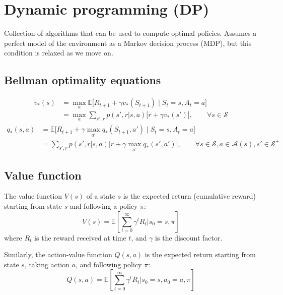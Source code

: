 \section{Dynamic programming (DP)}

Collection of algorithms that can be used to compute optimal policies.
Assumes a perfect model of the environment as a Markov decision process (MDP), but this condition is relaxed as we move on.

\subsection{Bellman optimality equations}

\begin{equation}
    \begin{aligned}
        v_*(s)
         & =
        \max_{a} \mathbb{E} \big[ R_{t+1} + \gamma v_*(S_{t+1}) \;\big|\; S_t = s, A_t = a \big]
        \\ & =
        \max_{a} \sum_{s', r} p(s', r | s, a) \Big[ r + \gamma v_*(s') \Big]
        , \qquad \forall s \in \mathcal{S}
    \end{aligned}
\end{equation}
\begin{equation}
    \begin{aligned}
        q_*(s, a)
         & =
        \mathbb{E} \big[ R_{t+1} + \gamma \max_{a'} q_*(S_{t+1}, a') \;\big|\; S_t = s, A_t = a \big]
        \\ & =
        \sum_{s', r} p(s', r | s, a) \Big[ r + \gamma \max_{a'} q_*(s', a') \Big]
        , \qquad \forall s \in \mathcal{S}, a \in \mathcal{A}(s), s' \in \mathcal{S}^+
    \end{aligned}
\end{equation}

\subsection{Value function}

The value function \( V(s) \) of a state \( s \) is the expected return (cumulative reward) starting from state \( s \) and following a policy \( \pi \):
\begin{equation}
    V(s) = \mathbb{E} \left[ \sum_{t=0}^{\infty} \gamma^t R_t | s_0 = s, \pi \right]
\end{equation}
where \( R_t \) is the reward received at time \( t \), and \( \gamma \) is the discount factor.

Similarly, the action-value function \( Q(s, a) \) is the expected return starting from state \( s \), taking action \( a \), and following policy \( \pi \):
\begin{equation}
    Q(s, a) = \mathbb{E} \left[ \sum_{t=0}^{\infty} \gamma^t R_t | s_0 = s, a_0 = a, \pi \right]
\end{equation}

